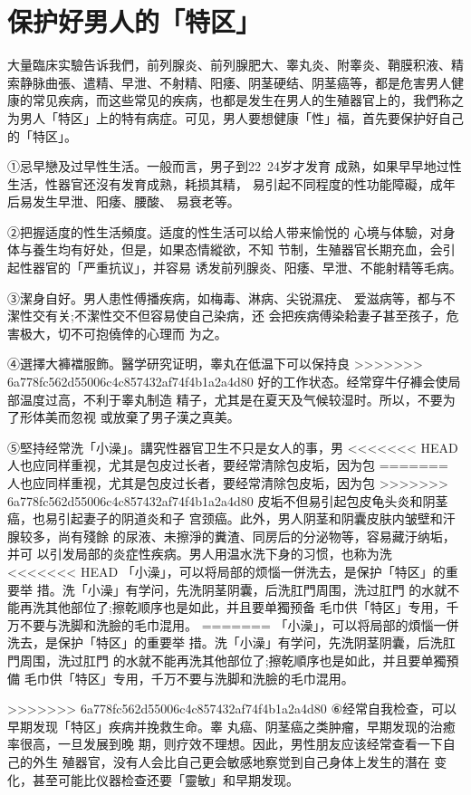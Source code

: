 \documentclass[12pt,UTF8]{ctexbook}
\begin{document}
\section{保护好男人的「特区」}

大量臨床实驗告诉我們，前列腺炎、前列腺肥大、睾丸炎、附睾炎、鞘膜积液、精索静脉曲張、遣精、早泄、不射精、阳痿、阴茎硬结、阴茎癌等，都是危害男人健康的常见疾病，而这些常见的疾病，也都是发生在男人的生殖器官上的，我們称之为男人「特区」上的特有病症。可见，男人要想健康「性」福，首先要保护好自己的「特区」。

①忌早戀及过早性生活。一般而言，男子到22~24岁才发育
成熟，如果早早地过性生活，性器官还沒有发育成熟，耗损其精，
易引起不同程度的性功能障礙，成年后易发生早泄、阳痿、腰酸、
易衰老等。

②把握适度的性生活頻度。适度的性生活可以给人带来愉悦的
心境与体驗，对身体与養生均有好处，但是，如果态情縱欲，不知
节制，生殖器官长期充血，会引起性器官的「严重抗议」，并容易
诱发前列腺炎、阳痿、早泄、不能射精等毛病。

③潔身自好。男人患性傅播疾病，如梅毒、淋病、尖锐濕疣、
爱滋病等，都与不潔性交有关;不潔性交不但容易使自己染病，还
会把疾病傅染耠妻子甚至孩子，危害极大，切不可抱僥倖的心理而
为之。

④選擇大褲襠服飾。醫学研究证明，睾丸在低温下可以保持良
>>>>>>> 6a778fc562d55006c4c857432af74f4b1a2a4d80
好的工作状态。经常穿牛仔褲会使局部温度过高，不利于睾丸制造
精子，尤其是在夏天及气候较湿时。所以，不要为了形体美而忽视
或放棄了男子漢之真美。

⑤堅持经常洗「小澡」。講究性器官卫生不只是女人的事，男
<<<<<<< HEAD
人也应同样重视，尤其是包皮过长者，要经常清除包皮垢，因为包
=======
人也应同样重视，尤其是包皮过长者，要经常清除包皮垢，因为包
>>>>>>> 6a778fc562d55006c4c857432af74f4b1a2a4d80
皮垢不但易引起包皮龟头炎和阴茎癌，也易引起妻子的阴道炎和子
宫颈癌。此外，男人阴茎和阴囊皮肤内皱壁和汗腺较多，尚有殘餘
的尿液、未擦淨的糞渣、同房后的分泌物等，容易藏汙纳垢，并可
以引发局部的炎症性疾病。男人用温水洗下身的习惯，也称为洗
<<<<<<< HEAD
「小澡」，可以将局部的烦惱一併洗去，是保护「特区」的重要举
措。洗「小澡」有学问，先洗阴茎阴囊，后洗肛門周围，洗过肛門
的水就不能再洗其他部位了;擦乾顺序也是如此，并且要单獨预备
毛巾供「特区」专用，千万不要与洗脚和洗臉的毛巾混用。
=======
「小澡」，可以将局部的煩惱一併洗去，是保护「特区」的重要举
措。洗「小澡」有学问，先洗阴茎阴囊，后洗肛門周围，洗过肛門
的水就不能再洗其他部位了;擦乾順序也是如此，并且要单獨預備
毛巾供「特区」专用，千万不要与洗脚和洗臉的毛巾混用。

>>>>>>> 6a778fc562d55006c4c857432af74f4b1a2a4d80
⑥经常自我检查，可以早期发现「特区」疾病并挽救生命。睾
丸癌、阴茎癌之类肿瘤，早期发现的治癒率很高，一旦发展到晚
期，则疗效不理想。因此，男性朋友应该经常查看一下自己的外生
殖器官，没有人会比自己更会敏感地察觉到自己身体上发生的潛在
变化，甚至可能比仪器检查还要「靈敏」和早期发现。
\end{document}
